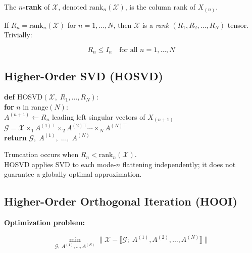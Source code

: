 \documentclass[12pt]{article}
\newcommand{\T}[1]{\mathcal{#1}}   %
\newcommand{\rank}{\mathrm{rank}}
\begin{document}
The \textbf{$n$-rank} of $\T{X}$, denoted $\rank_n(\T{X})$, is the column rank of $X_{(n)}$.

If $R_n = \rank_n(\T{X})$ for $n = 1, \ldots, N$,
then $\T{X}$ is a \emph{rank-$(R_1, R_2, \ldots, R_N)$} tensor. Trivially:

\begin{equation}
R_n \leq I_n \quad \text{for all } n = 1, \ldots, N
\end{equation}

\subsection{Higher-Order SVD (HOSVD)}

\bigskip
\begin{center}
\begin{minipage}{0.92\linewidth}
\renewcommand{\baselinestretch}{1.4}\selectfont
\textbf{def} HOSVD$(\T{X},\; R_1, \ldots, R_N)$:\\
\quad \textbf{for} $n$ in range$(N)$:\\
\qquad $A^{(n+1)} \leftarrow R_n$ leading left singular vectors of $X_{(n+1)}$\\
\quad $\T{G} = \T{X} \times_1 A^{(1)\top} \times_2 A^{(2)\top} \cdots \times_N A^{(N)\top}$\\
\quad \textbf{return} $\T{G},\; A^{(1)},\; \ldots,\; A^{(N)}$
\end{minipage}
\end{center}

\medskip
\noindent Truncation occurs when $R_n < \rank_n(\T{X})$.\\
HOSVD applies SVD to each mode-$n$ flattening independently;
it does not guarantee a globally optimal approximation.

\subsection{Higher-Order Orthogonal Iteration (HOOI)}

\noindent\textbf{Optimization problem:}

\begin{equation}
\min_{\T{G},\;A^{(1)},\ldots,A^{(N)}}
\bigl\|\T{X} - \llbracket \T{G};\; A^{(1)}, A^{(2)}, \ldots, A^{(N)} \rrbracket\bigr\|
\end{equation}
\end{document}
